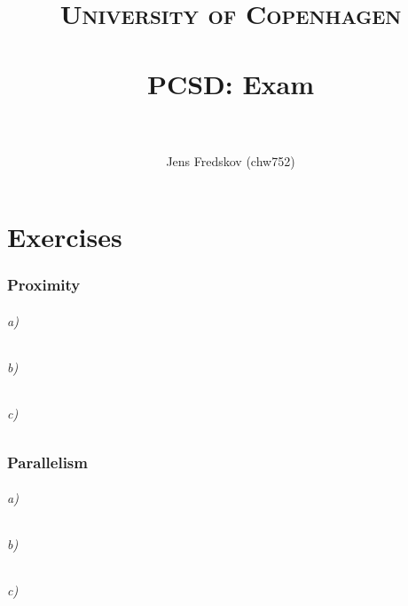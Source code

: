 \documentclass[a4paper, 11pt]{article}
\title{ 
\normalfont \normalsize 
\textsc{University of Copenhagen} \\ [25pt]
\horrule{0.5pt} \\[0.4cm]
\huge PCSD: Exam \\
\horrule{2pt} \\[0.5cm]
}
\author{Jens Fredskov (chw752)}
\begin{document}
\maketitle
\pagebreak

\part{Exercises} %
\label{prt:exercises_}

\section{Proximity} %
\label{sec:proximity}

\paragraph{a)} %


\paragraph{b)} %


\paragraph{c)} %



\section{Parallelism} %
\label{sec:parallelism}

\paragraph{a)} %


\paragraph{b)} %


\paragraph{c)} %
\end{document}
